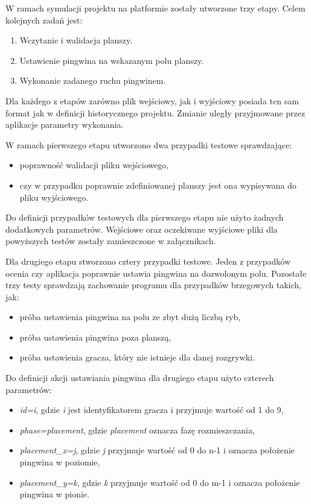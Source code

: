 W ramach symulacji projektu na platformie zostały utworzone trzy etapy.
Celem kolejnych zadań jest:
\begin{enumerate}
    \item Wczytanie i walidacja planszy.
    \item Ustawienie pingwina na wskazanym polu planszy.
    \item Wykonanie zadanego ruchu pingwinem.
\end{enumerate}

Dla każdego z etapów zarówno plik wejściowy, jak i wyjściowy posiada ten sam format jak w definicji historycznego projektu.
Zmianie uległy przyjmowane przez aplikacje parametry wykonania.


W ramach pierwszego etapu utworzono dwa przypadki testowe sprawdzające:
\begin{itemize}
    \item poprawność walidacji pliku wejściowego,
    \item czy w przypadku poprawnie zdefiniowanej planszy jest ona wypisywana do pliku wyjściowego.
\end{itemize}
Do definicji przypadków testowych dla pierwszego etapu nie użyto żadnych dodatkowych parametrów.
Wejściowe oraz oczekiwane wyjściowe pliki dla powyższych testów zostały zamieszczone w załącznikach.


Dla drugiego etapu stworzono cztery przypadki testowe.
Jeden z przypadków ocenia czy aplikacja poprawnie ustawia pingwina na dozwolonym polu.
Pozostałe trzy testy sprawdzają zachowanie programu dla przypadków brzegowych takich, jak:
\begin{itemize}
    \item próba ustawienia pingwina na polu ze zbyt dużą liczbą ryb,
    \item próba ustawienia pingwina poza planszą,
    \item próba ustawienia gracza, który nie istnieje dla danej rozgrywki.
\end{itemize}

Do definicji akcji ustawiania pingwina dla drugiego etapu użyto czterech parametrów:
\begin{itemize}
    \item \textit{id=i}, gdzie \textit{i} jest identyfikatorem gracza i przyjmuje wartość od 1 do 9,
    \item \textit{phase=placement}, gdzie \textit{placement} oznacza fazę rozmieszczania,
    \item \textit{placement\_x=j}, gdzie \textit{j} przyjmuje wartość od 0 do n-1 i oznacza położenie pingwina w poziomie,
    \item \textit{placement\_y=k}, gdzie \textit{k} przyjmuje wartość od 0 do m-1 i oznacza położenie pingwina w pionie.
\end{itemize}

